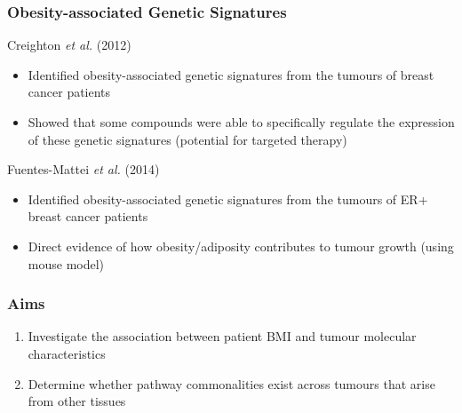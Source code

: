 \documentclass[handout]{beamer}
\begin{document}
\begin{frame}
	\frametitle{Obesity-associated Genetic Signatures}
	Creighton \textit{et al.} (2012)
	\begin{itemize}
		\item Identified obesity-associated genetic signatures from the tumours of breast cancer patients
		\item Showed that some compounds were able to specifically regulate the expression of these genetic signatures (potential for targeted therapy)
	\end{itemize}
	Fuentes-Mattei \textit{et al.} (2014)
	\begin{itemize}
		\item Identified obesity-associated genetic signatures from the tumours of ER+ breast cancer patients
		\item Direct evidence of how obesity/adiposity contributes to tumour growth (using mouse model)
	\end{itemize}
\end{frame}


\begin{frame}
	\frametitle{Aims}
	\begin{enumerate}
		\item Investigate the association between patient BMI and tumour molecular characteristics
		\item Determine whether pathway commonalities exist across tumours that arise from other tissues
	\end{enumerate}
\end{frame}

\end{document}
